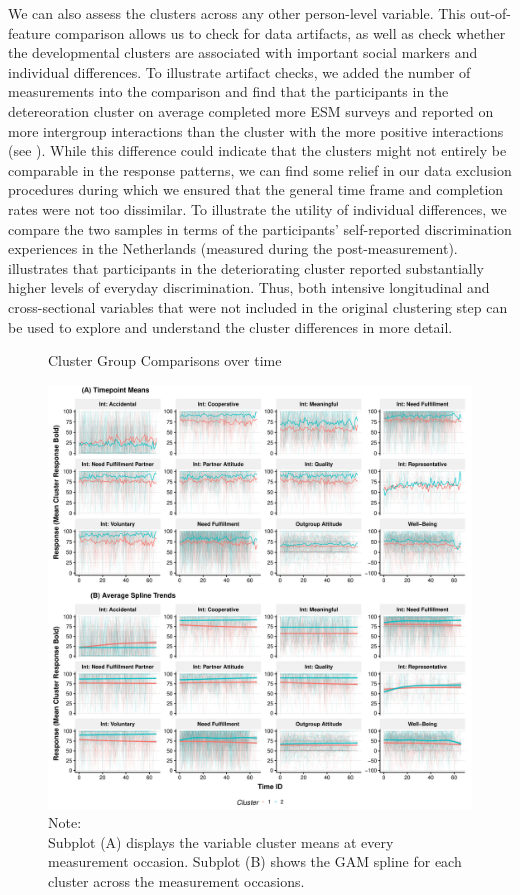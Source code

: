 We can also assess the clusters across any other person-level variable.
This out-of-feature comparison allows us to check for data artifacts, as
well as check whether the developmental clusters are associated with
important social markers and individual differences. To illustrate
artifact checks, we added the number of measurements into the comparison
and find that the participants in the detereoration cluster on average
completed more ESM surveys and reported on more intergroup interactions
than the cluster with the more positive interactions (see
). While this difference could indicate that
the clusters might not entirely be comparable in the response patterns,
we can find some relief in our data exclusion procedures during which we
ensured that the general time frame and completion rates were not too
dissimilar. To illustrate the utility of individual differences, we
compare the two samples in terms of the participants' self-reported
discrimination experiences in the Netherlands (measured during the
post-measurement).  illustrates that
participants in the deteriorating cluster reported substantially higher
levels of everyday discrimination. Thus, both intensive longitudinal and
cross-sectional variables that were not included in the original
clustering step can be used to explore and understand the cluster
differences in more detail.

\begin{figure}[!ht] %
  \caption{Cluster Group Comparisons over time}
  \label{fig:clusterTs}
  \centering\includegraphics[width=\textwidth]{figures/clusterTsComb.pdf}
  \caption*{Note: \\
  Subplot (A) displays the variable cluster means at every measurement occasion. Subplot (B) shows the GAM spline for each cluster across the measurement occasions.}
\end{figure}
